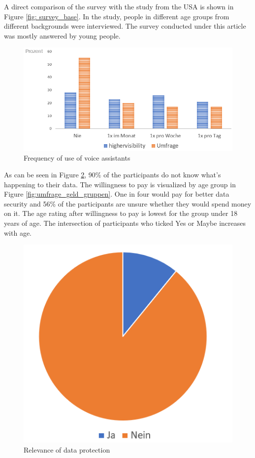 A direct comparison of the survey with the study from the USA is shown in Figure \ref{fig: survey_base}. In the study, people in different age groups from different backgrounds were interviewed. The survey conducted under this article was mostly answered by young people.
\begin{figure}[h]
	\centering
	\includegraphics[width=0.9\linewidth]{Picture/umfrage_haeufigkeit}
	\caption[Frequency of use of voice assistants]{Frequency of use of voice assistants}
	\label{fig:umfrage_haeufigkeit}
\end{figure} 

As can be seen in Figure \ref{fig:umfrage_datenschutz}, 90\% of the participants do not know what's happening to their data. The willingness to pay is visualized by age group in Figure \ref{fig:umfrage_geld_gruppen}. One in four would pay for better data security and 56\% of the participants are unsure whether they would spend money on it. The age rating after willingness to pay is lowest for the group under 18 years of age. The intersection of participants who ticked \glqq Yes\grqq{} or \glqq Maybe\grqq{} increases with age.

\begin{figure}[h]
	\centering
	\includegraphics[width=0.5\linewidth]{Picture/umfrage_datenschutz}
	\caption[Relevance of data protection]{Relevance of data protection}
	\label{fig:umfrage_datenschutz}
\end{figure}

